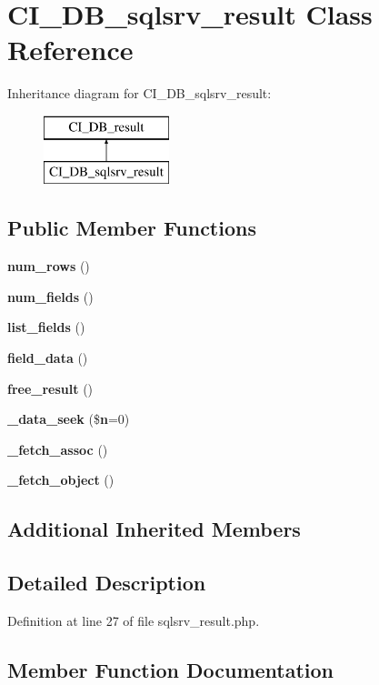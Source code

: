 \section{C\-I\-\_\-\-D\-B\-\_\-sqlsrv\-\_\-result Class Reference}
\label{class_c_i___d_b__sqlsrv__result}
Inheritance diagram for C\-I\-\_\-\-D\-B\-\_\-sqlsrv\-\_\-result\-:\begin{figure}[H]
\begin{center}
\leavevmode
\includegraphics[height=2.000000cm]{class_c_i___d_b__sqlsrv__result}
\end{center}
\end{figure}
\subsection*{Public Member Functions}
\begin{DoxyCompactItemize}
\item 
{\bf num\-\_\-rows} ()
\item 
{\bf num\-\_\-fields} ()
\item 
{\bf list\-\_\-fields} ()
\item 
{\bf field\-\_\-data} ()
\item 
{\bf free\-\_\-result} ()
\item 
{\bf \-\_\-data\-\_\-seek} (\${\bf n}=0)
\item 
{\bf \-\_\-fetch\-\_\-assoc} ()
\item 
{\bf \-\_\-fetch\-\_\-object} ()
\end{DoxyCompactItemize}
\subsection*{Additional Inherited Members}


\subsection{Detailed Description}


Definition at line 27 of file sqlsrv\-\_\-result.\-php.



\subsection{Member Function Documentation}
